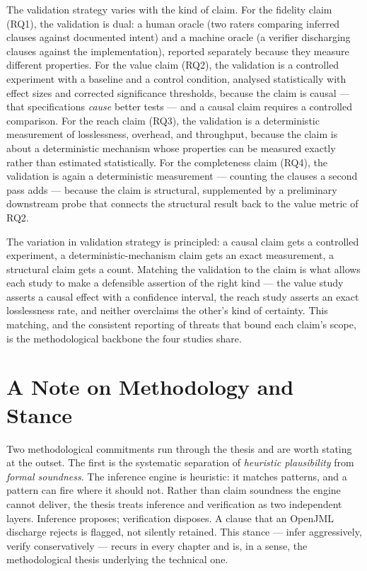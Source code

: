 The validation strategy varies with the kind of claim. For the fidelity claim
(RQ1), the validation is dual: a human oracle (two raters comparing inferred
clauses against documented intent) and a machine oracle (a verifier discharging
clauses against the implementation), reported separately because they measure
different properties. For the value claim (RQ2), the validation is a controlled
experiment with a baseline and a control condition, analysed statistically with
effect sizes and corrected significance thresholds, because the claim is causal ---
that specifications \emph{cause} better tests --- and a causal claim requires a
controlled comparison. For the reach claim (RQ3), the validation is a deterministic
measurement of losslessness, overhead, and throughput, because the claim is about
a deterministic mechanism whose properties can be measured exactly rather than
estimated statistically. For the completeness claim (RQ4), the validation is again
a deterministic measurement --- counting the clauses a second pass adds --- because
the claim is structural, supplemented by a preliminary downstream probe that
connects the structural result back to the value metric of RQ2.

The variation in validation strategy is principled: a causal claim gets a
controlled experiment, a deterministic-mechanism claim gets an exact measurement,
a structural claim gets a count. Matching the validation to the claim is what
allows each study to make a defensible assertion of the right kind --- the value
study asserts a causal effect with a confidence interval, the reach study asserts
an exact losslessness rate, and neither overclaims the other's kind of certainty.
This matching, and the consistent reporting of threats that bound each claim's
scope, is the methodological backbone the four studies share.

\section{A Note on Methodology and Stance}

Two methodological commitments run through the thesis and are worth stating
at the outset. The first is the systematic separation of \emph{heuristic
plausibility} from \emph{formal soundness}. The inference engine is
heuristic: it matches patterns, and a pattern can fire where it should not.
Rather than claim soundness the engine cannot deliver, the thesis treats
inference and verification as two independent layers. Inference proposes;
verification disposes. A clause that an OpenJML discharge rejects is flagged,
not silently retained. This stance --- infer aggressively, verify
conservatively --- recurs in every chapter and is, in a sense, the
methodological thesis underlying the technical one.

